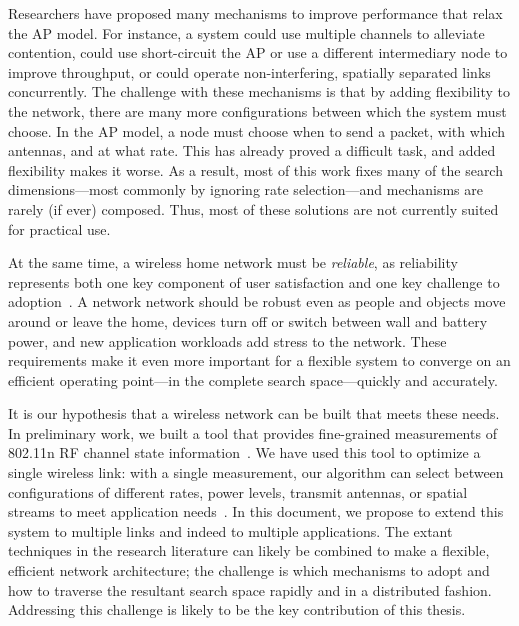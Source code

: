 Researchers have proposed many mechanisms to improve performance that relax the AP model. For instance, a system could use multiple channels to alleviate contention, could use short-circuit the AP or use a different intermediary node to improve throughput, or could operate non-interfering, spatially separated links concurrently. The challenge with these mechanisms is that by adding flexibility to the network, there are many more configurations between which the system must choose. In the AP model, a node must choose when to send a packet, with which antennas, and at what rate. This has already proved a difficult task, and added flexibility makes it worse. As a result, most of this work fixes many of the search dimensions---most commonly by ignoring rate selection---and mechanisms are rarely (if ever) composed. Thus, most of these solutions are not currently suited for practical use.

At the same time, a wireless home network must be \emph{reliable}, as reliability represents both one key component of user satisfaction and one key challenge to adoption~\cite{edwards_challenges}. A network network should be robust even as people and objects move around or leave the home, devices turn off or switch between wall and battery power, and new application workloads add stress to the network. These requirements make it even more important for a flexible system to converge on an efficient operating point---in the complete search space---quickly and accurately.

It is our hypothesis that a wireless network can be built that meets these needs. In preliminary work, we built a tool that provides fine-grained measurements of 802.11n RF channel state information~\cite{halperin_csitool}. We have used this tool to optimize a single wireless link: with a single measurement, our algorithm can select between configurations of different rates, power levels, transmit antennas, or spatial streams to meet application needs~\cite{halperin_esnr}. In this document, we propose to extend this system to multiple links and indeed to multiple applications. The extant techniques in the research literature can likely be combined to make a flexible, efficient network architecture; the challenge is which mechanisms to adopt and how to traverse the resultant search space rapidly and in a distributed fashion. Addressing this challenge is likely to be the key contribution of this thesis.

